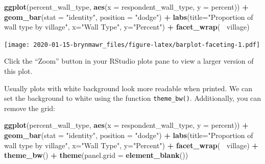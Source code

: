 \documentclass[]{book}
\newenvironment{Shaded}{\begin{snugshade}}{\end{snugshade}}
\newcommand{\KeywordTok}[1]{\textcolor[rgb]{0.13,0.29,0.53}{\textbf{#1}}}
\newcommand{\DataTypeTok}[1]{\textcolor[rgb]{0.13,0.29,0.53}{#1}}
\newcommand{\StringTok}[1]{\textcolor[rgb]{0.31,0.60,0.02}{#1}}
\newcommand{\OperatorTok}[1]{\textcolor[rgb]{0.81,0.36,0.00}{\textbf{#1}}}
\newcommand{\NormalTok}[1]{#1}
\begin{document}
\begin{Shaded}
\begin{Highlighting}[]
\KeywordTok{ggplot}\NormalTok{(percent_wall_type, }\KeywordTok{aes}\NormalTok{(}\DataTypeTok{x =}\NormalTok{ respondent_wall_type, }\DataTypeTok{y =}\NormalTok{ percent)) }\OperatorTok{+}
\StringTok{    }\KeywordTok{geom_bar}\NormalTok{(}\DataTypeTok{stat =} \StringTok{"identity"}\NormalTok{, }\DataTypeTok{position =} \StringTok{"dodge"}\NormalTok{) }\OperatorTok{+}
\StringTok{    }\KeywordTok{labs}\NormalTok{(}\DataTypeTok{title=}\StringTok{"Proportion of wall type by village"}\NormalTok{,}
         \DataTypeTok{x=}\StringTok{"Wall Type"}\NormalTok{,}
         \DataTypeTok{y=}\StringTok{"Percent"}\NormalTok{) }\OperatorTok{+}
\StringTok{    }\KeywordTok{facet_wrap}\NormalTok{(}\OperatorTok{~}\StringTok{ }\NormalTok{village)}
\end{Highlighting}
\end{Shaded}

\texttt{[image: 2020-01-15-brynmawr\_files/figure-latex/barplot-faceting-1.pdf]}

Click the ``Zoom'' button in your RStudio plots pane to view a larger
version of this plot.

Usually plots with white background look more readable when printed. We
can set the background to white using the function \texttt{theme\_bw()}.
Additionally, you can remove the grid:

\begin{Shaded}
\begin{Highlighting}[]
\KeywordTok{ggplot}\NormalTok{(percent_wall_type, }\KeywordTok{aes}\NormalTok{(}\DataTypeTok{x =}\NormalTok{ respondent_wall_type, }\DataTypeTok{y =}\NormalTok{ percent)) }\OperatorTok{+}
\StringTok{    }\KeywordTok{geom_bar}\NormalTok{(}\DataTypeTok{stat =} \StringTok{"identity"}\NormalTok{, }\DataTypeTok{position =} \StringTok{"dodge"}\NormalTok{) }\OperatorTok{+}
\StringTok{    }\KeywordTok{labs}\NormalTok{(}\DataTypeTok{title=}\StringTok{"Proportion of wall type by village"}\NormalTok{,}
         \DataTypeTok{x=}\StringTok{"Wall Type"}\NormalTok{,}
         \DataTypeTok{y=}\StringTok{"Percent"}\NormalTok{) }\OperatorTok{+}
\StringTok{    }\KeywordTok{facet_wrap}\NormalTok{(}\OperatorTok{~}\StringTok{ }\NormalTok{village) }\OperatorTok{+}
\StringTok{    }\KeywordTok{theme_bw}\NormalTok{() }\OperatorTok{+}
\StringTok{    }\KeywordTok{theme}\NormalTok{(}\DataTypeTok{panel.grid =} \KeywordTok{element_blank}\NormalTok{())}
\end{Highlighting}
\end{Shaded}
\end{document}
